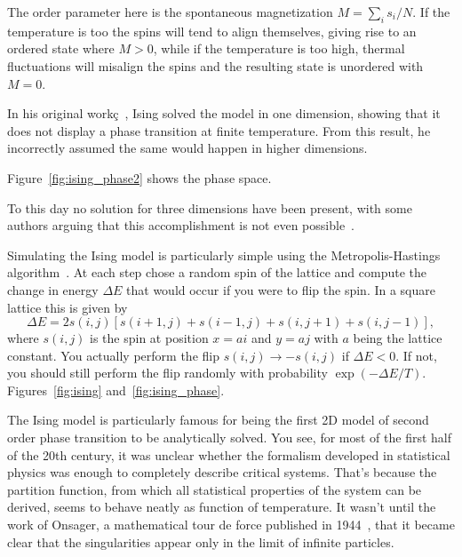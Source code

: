 The order parameter here is the spontaneous magnetization $M=\sum_i s_i / N$.
If the temperature is too the spins will tend to align themselves, giving rise
to an ordered state where $M>0$, while if the temperature is too high, thermal
fluctuations will misalign the spins and the resulting state is unordered
with $M=0$.

In his original workç~\cite{Ising1925}, Ising solved the model in one
dimension, showing that it does not display a phase transition at finite
temperature. From this result, he  incorrectly assumed the same would happen in
higher dimensions.

Figure~\ref{fig:ising_phase2} shows the phase space.

To this day no solution for three dimensions have been present, with some
authors arguing that this accomplishment is not even
possible~\cite{Istrail2000}.

Simulating the Ising model is particularly simple using the Metropolis-Hastings
algorithm~\cite{Hastings1970}. At each step chose a random spin of the lattice
and compute the change in energy $\Delta E$ that would occur if you were to
flip the spin. In a square lattice this is given by
\begin{equation}
    \Delta E=2s\left(i,j\right)\left[s\left(i+1,j\right)+
    s\left(i-1,j\right)+s\left(i,j+1\right)+s\left(i,j-1\right)\right],
\end{equation}
where $s(i,j)$ is the spin at position $x=ai$ and $y=aj$ with $a$ being the
lattice constant. You actually perform the flip $s(i,j)\rightarrow -s(i,j)$ if
$\Delta E < 0$. If not, you should still perform the flip randomly with
probability $\exp(-\Delta E / T)$. Figures~\ref{fig:ising}
and~\ref{fig:ising_phase}.

The Ising model is particularly famous for being the first 2D model of second
order phase transition to be analytically solved. You see, for most of the
first half of the 20th century, it was unclear whether the formalism developed
in statistical physics was enough to completely describe critical systems.
That's because the partition function, from which all statistical properties of
the system can be derived, seems to behave neatly as function of temperature.
It wasn't until the work of Onsager, a mathematical tour de force published in
1944~\cite{Onsager1944}, that it became clear that the singularities appear
only in the limit of infinite particles.


